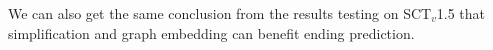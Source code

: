 We can also get the same conclusion from the results testing on SCT$_v$1.5
that simplification and graph embedding can benefit ending prediction.

